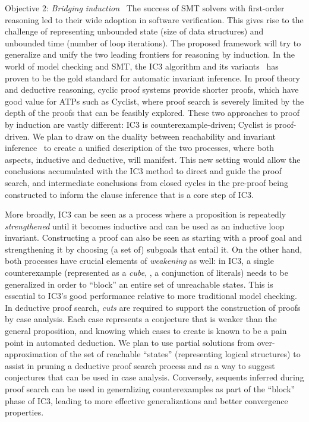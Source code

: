 \begin{paragraph}{Objective 2: {\it Bridging induction}}~
The success of SMT solvers with first-order reasoning led to their wide adoption in software verification.
This gives rise to the challenge of representing unbounded state (\eg size of data structures) and unbounded time (\eg number of loop iterations).
The proposed framework will try to generalize and unify the two leading frontiers for reasoning by induction.
In the world of model checking and SMT, the IC3 algorithm and its variants~ has proven to be the gold standard for automatic invariant inference.
In proof theory and deductive reasoning, cyclic proof systems provide shorter proofs, which have good value for ATPs such as Cyclist, where proof search is severely limited by the depth of the proofs that can be feasibly explored.
These two approaches to proof by induction are vastly different: IC3 is counterexample-driven; Cyclist is proof-driven.
We plan to draw on the duality between reachability and invariant inference~ to create a unified description of the two processes, where both aspects, inductive and deductive, will manifest.
This new setting would allow the conclusions accumulated with the IC3 method to direct and guide the proof search, and intermediate conclusions from closed cycles in the pre-proof being constructed to inform the clause inference that is a core step of IC3.

More broadly, IC3 can be seen as a process where a proposition is repeatedly \emph{strengthened} until it becomes inductive and can be used as an inductive loop invariant.
Constructing a proof can also be seen as starting with a proof goal and strengthening it by choosing (a set of) subgoals that entail it.
On the other hand, both processes have crucial elements of \emph{weakening} as well: in IC3, a single counterexample (represented as a \emph{cube}, \ie, a conjunction of literals) needs to be generalized in order to ``block'' an entire set of unreachable states.
This is essential to IC3's good performance relative to more traditional model checking.
In deductive proof search, \emph{cuts} are required to support the construction of proofs by case analysis.
Each case represents a conjecture that is weaker than the general proposition, and knowing which  cases to create is known to be a pain point in automated deduction.
We plan to use partial solutions from over-approximation of the set of reachable ``states'' (representing logical structures) to assist in pruning a deductive proof search process and as a way to suggest conjectures that can be used in case analysis.
Conversely, sequents inferred during proof search can be used in generalizing counterexamples as part of the ``block'' phase of IC3, leading to more effective generalizations and better convergence properties.


\end{paragraph}
